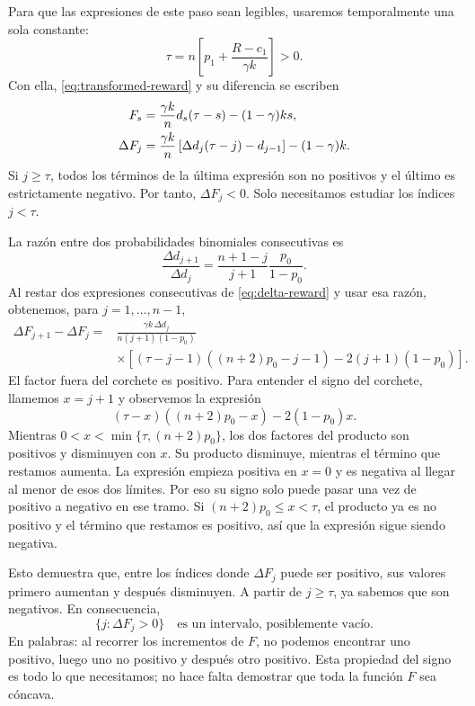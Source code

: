 \documentclass[11pt,a4paper]{article}
\begin{document}
Para que las expresiones de este paso sean legibles, usaremos
temporalmente una sola constante:
\[
\tau=n\left[p_1+\frac{R-c_1}{\gamma k}\right]>0.
\]
Con ella, \eqref{eq:transformed-reward} y su diferencia se escriben
\begin{align}
F_s&=\frac{\gamma k}{n}d_s(\tau-s)-(1-\gamma)ks,
\notag\\
\Delta F_j&=\frac{\gamma k}{n}
 \left[\Delta d_j(\tau-j)-d_{j-1}\right]-(1-\gamma)k.
\label{eq:delta-reward}
\end{align}
Si $j\ge\tau$, todos los términos de la última expresión son no
positivos y el último es estrictamente negativo. Por tanto,
$\Delta F_j<0$. Solo necesitamos estudiar los índices $j<\tau$.

La razón entre dos probabilidades binomiales consecutivas es
\[
\frac{\Delta d_{j+1}}{\Delta d_j}
  =\frac{n+1-j}{j+1}\frac{p_0}{1-p_0}.
\]
Al restar dos expresiones consecutivas de \eqref{eq:delta-reward}
y usar esa razón, obtenemos, para $j=1,\ldots,n-1$,
\begin{equation}
\begin{aligned}
\Delta F_{j+1}-\Delta F_j
={}&\frac{\gamma k\,\Delta d_j}{n(j+1)(1-p_0)}\\[-0.2em]
&\times\left[(\tau-j-1)((n+2)p_0-j-1)
                     -2(j+1)(1-p_0)\right].
\end{aligned}
\label{eq:second-difference}
\end{equation}
El factor fuera del corchete es positivo. Para entender el signo del
corchete, llamemos $x=j+1$ y observemos la expresión
\begin{equation}
(\tau-x)((n+2)p_0-x)-2(1-p_0)x.
\label{eq:sign-expression}
\end{equation}
Mientras $0<x<\min\{\tau,(n+2)p_0\}$, los dos factores del producto
son positivos y disminuyen con $x$. Su producto disminuye, mientras
el término que restamos aumenta. La expresión empieza positiva en
$x=0$ y es negativa al llegar al menor de esos dos límites. Por eso
su signo solo puede pasar una vez de positivo a negativo en ese tramo.
Si $(n+2)p_0\le x<\tau$, el producto ya es no positivo y el término
que restamos es positivo, así que la expresión sigue siendo negativa.

Esto demuestra que, entre los índices donde $\Delta F_j$ puede ser
positivo, sus valores primero aumentan y después disminuyen. A partir
de $j\ge\tau$, ya sabemos que son negativos. En consecuencia,
\begin{equation}
\{j:\Delta F_j>0\}\quad\text{es un intervalo, posiblemente vacío.}
\label{eq:positive-F}
\end{equation}
En palabras: al recorrer los incrementos de $F$, no podemos encontrar
uno positivo, luego uno no positivo y después otro positivo.
Esta propiedad del signo es todo lo que necesitamos; no hace falta
demostrar que toda la función $F$ sea cóncava.
\end{document}
